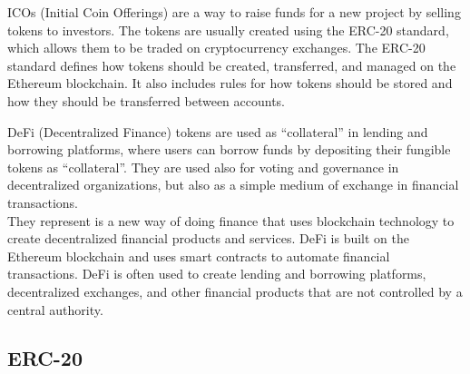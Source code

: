 ICOs (Initial Coin Offerings) are a way to raise funds for a new project by selling tokens to investors. The tokens are usually created using the ERC-20 standard, which allows them to be traded on cryptocurrency exchanges. The ERC-20 standard defines how tokens should be created, transferred, and managed on the Ethereum blockchain. It also includes rules for how tokens should be stored and how they should be transferred between accounts.

DeFi (Decentralized Finance) tokens are used as ``collateral'' in lending and borrowing platforms, where users can borrow
funds by depositing their fungible tokens as ``collateral''.
They are used also for voting and governance in decentralized organizations, but also as a simple medium of exchange in financial transactions.\\ 
They represent  is a new way of doing finance that uses blockchain technology to create decentralized financial products and services. DeFi is built on the Ethereum blockchain and uses smart contracts to automate financial transactions. DeFi is often used to create lending and borrowing platforms, decentralized exchanges, and other financial products that are not controlled by a central authority.
\newpage
\subsection{ERC-20}

